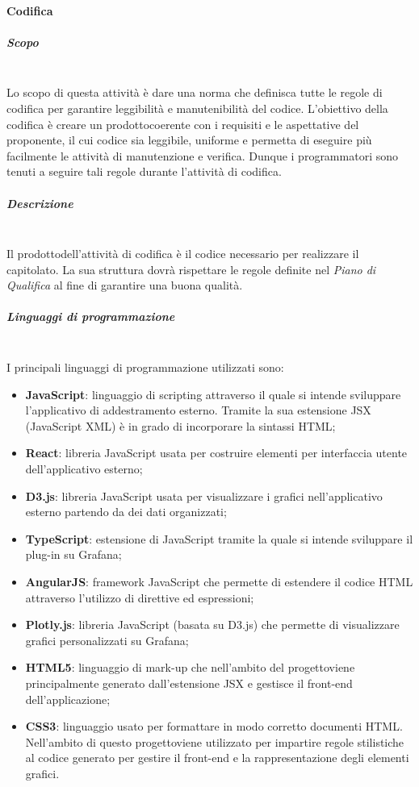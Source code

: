 \paragraph{Codifica}
\subparagraph*{Scopo}\mbox{}\\ [1mm]
Lo scopo di questa attività è dare una norma che definisca tutte le regole di codifica per garantire leggibilità e manutenibilità del codice.
L'obiettivo della codifica è creare un prodotto\glosp coerente con i requisiti e le aspettative del proponente, il cui codice sia leggibile, uniforme e permetta di eseguire più facilmente le attività di manutenzione e verifica. Dunque i programmatori sono tenuti a seguire tali regole durante l'attività di codifica.
\subparagraph*{Descrizione}\mbox{}\\ [1mm]
Il prodotto\glosp dell'attività di codifica è il codice necessario per realizzare il capitolato\glo. La sua struttura dovrà rispettare le regole definite nel \textit{Piano di Qualifica} al fine di garantire una buona qualità.
\subparagraph*{Linguaggi di programmazione}\mbox{}\\ [1mm]
I principali linguaggi di programmazione utilizzati sono:
\begin{itemize}
	\item \textbf{JavaScript}: linguaggio di scripting attraverso il quale si intende sviluppare l'applicativo di addestramento esterno. Tramite la sua estensione JSX (JavaScript XML) è in grado di incorporare la sintassi HTML;
	\item \textbf{React}: libreria JavaScript usata per costruire elementi per interfaccia utente dell'applicativo esterno;
	\item \textbf{D3.js}: libreria JavaScript usata per visualizzare i grafici nell'applicativo esterno partendo da dei dati organizzati;
	\item \textbf{TypeScript}: estensione di JavaScript tramite la quale si intende sviluppare il plug-in su Grafana\glo;
	\item \textbf{AngularJS}: framework JavaScript che permette di estendere il codice HTML attraverso l'utilizzo di direttive ed espressioni;
	\item \textbf{Plotly.js}: libreria JavaScript (basata su D3.js) che permette di visualizzare grafici personalizzati su Grafana\glo; 
	\item \textbf{HTML5}: linguaggio di mark-up che nell'ambito del progetto\glosp viene principalmente generato dall'estensione JSX e gestisce il front-end dell'applicazione;
	\item \textbf{CSS3}: linguaggio usato per formattare in modo corretto documenti HTML. Nell'ambito di questo progetto\glosp viene utilizzato per impartire regole stilistiche al codice generato per gestire il front-end e la rappresentazione degli elementi grafici.
\end{itemize}
